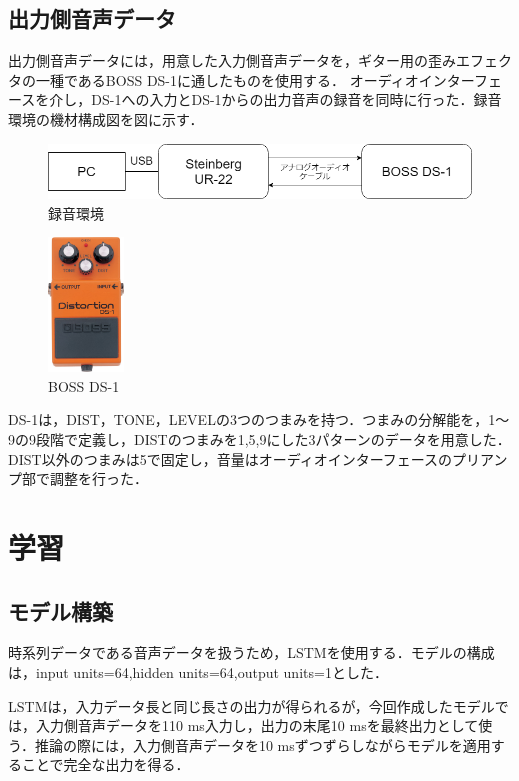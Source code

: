 \documentclass{jreport}		%
\begin{document}
\subsection{出力側音声データ}
出力側音声データには，用意した入力側音声データを，ギター用の歪みエフェクタの一種であるBOSS DS-1に通したものを使用する．
オーディオインターフェースを介し，DS-1への入力とDS-1からの出力音声の録音を同時に行った．録音環境の機材構成図を図に示す．

\begin{figure}[htbp]
 \begin{center}
  \includegraphics[width=120mm]{env.png}
 \end{center}
 \caption{録音環境}
 \label{fig:one}
\end{figure}

\begin{figure}[htbp]
 \begin{center}
  \includegraphics[width=20mm]{ds1.jpg}
 \end{center}
 \caption{BOSS DS-1}
 \label{fig:one}
\end{figure}

DS-1は，DIST，TONE，LEVELの3つのつまみを持つ．つまみの分解能を，1～9の9段階で定義し，DISTのつまみを1,5,9にした3パターンのデータを用意した．DIST以外のつまみは5で固定し，音量はオーディオインターフェースのプリアンプ部で調整を行った．

\section{学習}

\subsection{モデル構築}
時系列データである音声データを扱うため，LSTMを使用する．モデルの構成は，input units=64,hidden units=64,output units=1とした．

LSTMは，入力データ長と同じ長さの出力が得られるが，今回作成したモデルでは，入力側音声データを110 ms入力し，出力の末尾10 msを最終出力として使う．推論の際には，入力側音声データを10 msずつずらしながらモデルを適用することで完全な出力を得る．
\end{document}
